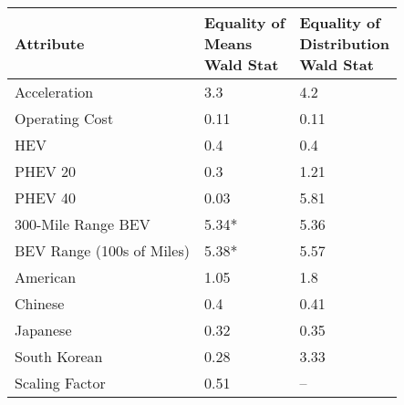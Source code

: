 \begin{tabular}{lll}
\toprule
                Attribute & \makecell{Equality of \\ Means \\ Wald Stat} & \makecell{Equality of \\ Distribution \\ Wald Stat} \\
\midrule
             Acceleration &                         \multirow{1}{*}{3.3} &                               \multirow{1}{*}{4.2} \\
           Operating Cost &                        \multirow{1}{*}{0.11} &                              \multirow{1}{*}{0.11} \\
                      HEV &                         \multirow{1}{*}{0.4} &                               \multirow{1}{*}{0.4} \\
                  PHEV 20 &                         \multirow{1}{*}{0.3} &                              \multirow{1}{*}{1.21} \\
                  PHEV 40 &                        \multirow{1}{*}{0.03} &                              \multirow{1}{*}{5.81} \\
       300-Mile Range BEV &                       \multirow{1}{*}{5.34*} &                              \multirow{1}{*}{5.36} \\
BEV Range (100s of Miles) &                       \multirow{1}{*}{5.38*} &                              \multirow{1}{*}{5.57} \\
                 American &                        \multirow{1}{*}{1.05} &                               \multirow{1}{*}{1.8} \\
                  Chinese &                         \multirow{1}{*}{0.4} &                              \multirow{1}{*}{0.41} \\
                 Japanese &                        \multirow{1}{*}{0.32} &                              \multirow{1}{*}{0.35} \\
             South Korean &                        \multirow{1}{*}{0.28} &                              \multirow{1}{*}{3.33} \\
           Scaling Factor &                        \multirow{1}{*}{0.51} &                                                 -- \\
\bottomrule
\end{tabular}
